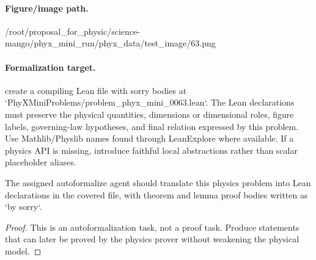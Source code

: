 \paragraph{Figure/image path.}
/root/proposal\_for\_physic/science-mango/phyx\_mini\_run/phyx\_data/test\_image/63.png

\paragraph{Formalization target.}
create a compiling Lean file with sorry bodies at `PhyXMiniProblems/problem\_phyx\_mini\_0063.lean`. The Lean declarations must preserve the physical quantities, dimensions or dimensional roles, figure labels, governing-law hypotheses, and final relation expressed by this problem.
Use Mathlib/Physlib names found through LeanExplore where available. If a physics API is missing, introduce faithful local abstractions rather than scalar placeholder aliases.

\begin{theorem}
\label{thm:physics:phyx_mini_0063:target}
The assigned autoformalize agent should translate this physics problem into Lean declarations in the covered file, with theorem and lemma proof bodies written as `by sorry`.
\end{theorem}
\begin{proof}
This is an autoformalization task, not a proof task. Produce statements that can later be proved by the physics prover without weakening the physical model.
\end{proof}

